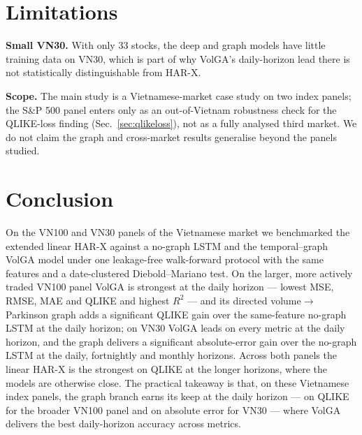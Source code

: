 \documentclass{llncs}
\begin{document}
\section{Limitations}
\noindent\textbf{Small VN30.} With only 33 stocks, the deep and graph models have little training data
on VN30, which is part of why VolGA's daily-horizon lead there is not statistically distinguishable
from HAR-X.

\noindent\textbf{Scope.} The main study is a Vietnamese-market case study on two index panels; the
S\&P 500 panel enters only as an out-of-Vietnam robustness check for the QLIKE-loss finding
(Sec.~\ref{sec:qlikeloss}), not as a fully analysed third market. We do not claim the graph and
cross-market results generalise beyond the panels studied.

\section{Conclusion}
On the VN100 and VN30 panels of the Vietnamese market we benchmarked the extended linear HAR-X against
a no-graph LSTM and the temporal--graph VolGA model under one leakage-free walk-forward protocol with
the same features and a date-clustered Diebold--Mariano test. On the larger, more actively traded VN100 panel
VolGA is strongest at the daily horizon --- lowest MSE, RMSE, MAE and QLIKE and highest $R^2$ --- and
its directed volume$\to$Parkinson graph adds a significant QLIKE gain over the same-feature no-graph
LSTM at the daily horizon; on VN30 VolGA leads on every metric at the daily
horizon, and the graph delivers a significant absolute-error gain over the no-graph LSTM at the daily,
fortnightly and monthly horizons. Across both panels the linear HAR-X is the strongest on QLIKE at the
longer horizons, where the models are otherwise close. The practical takeaway is that, on these
Vietnamese index panels, the graph branch earns its keep at the daily horizon --- on QLIKE for the
broader VN100 panel and on absolute error for VN30 --- where VolGA delivers the best daily-horizon
accuracy across metrics.
\end{document}
